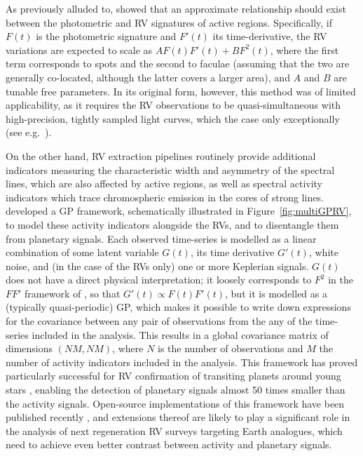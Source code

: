 \documentclass[letterpaper]{ar-1col}
\begin{document}
As previously alluded to, \citet{2012MNRAS.419.3147A} showed that an approximate relationship should exist between the photometric and RV signatures of active regions. Specifically, if $F(t)$ is the photometric signature and $F'(t)$ its time-derivative, the RV variations are expected to scale as $A F(t) F'(t) + B F^2(t)$, where the first term corresponds to spots and the second to faculae (assuming that the two are generally co-located, although the latter covers a larger area), and $A$ and $B$ are tunable free parameters. In its original form, however, this method was of limited applicability, as it requires the RV observations to be quasi-simultaneous with high-precision, tightly sampled light curves, which the case only exceptionally (see e.g.\ \citealt{2014MNRAS.445.3401G}). 

On the other hand, RV extraction pipelines routinely provide additional indicators measuring the characteristic width and asymmetry of the spectral lines, which are also affected by active regions, as well as spectral activity indicators which trace chromospheric emission in the cores of strong lines. \citet{2015MNRAS.452.2269R} developed a GP framework, schematically illustrated in Figure~\ref{fig:multiGPRV}, to model these activity indicators alongside the RVs, and to disentangle them from planetary signals. Each observed time-series is modelled as a linear combination of some latent variable $G(t)$, its time derivative $G'(t)$, white noise, and (in the case of the RVs only) one or more Keplerian signals. $G(t)$ does not have a direct physical interpretation; it loosely corresponds to $F^2$ in the $FF'$ framework of \citet{2012MNRAS.419.3147A}, so that $G'(t) \propto F(t) F'(t)$, but it is modelled as a (typically quasi-periodic) GP, which makes it possible to write down expressions for the covariance between any pair of observations from the any of the time-series included in the analysis. This results in a global covariance matrix of dimensions $(NM,NM)$, where $N$ is the number of observations and $M$ the number of activity indicators included in the analysis. This framework has proved particularly successful for RV confirmation of transiting planets around young stars \citep{2019MNRAS.490..698B,2022MNRAS.512.3060Z}, enabling the detection of planetary signals almost 50 times smaller than the activity signals.  Open-source implementations of this framework have been published recently \citep{2022MNRAS.509..866B,2022A&A...659A.182D}, and extensions thereof are likely to play a significant role in the analysis of next regeneration RV surveys targeting Earth analogues, which need to achieve even better contrast between activity and planetary signals.
\end{document}
